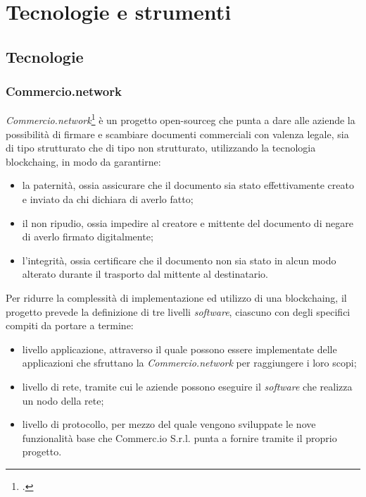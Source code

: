 
\chapter{Tecnologie e strumenti}
\label{cap:tecnologie-strumenti}

\section{Tecnologie}
\subsection{Commercio.network}

\textit{Commercio.network}\footcite{site:commercio-network} è un progetto \gls{open-sourceg} che punta a dare alle aziende la possibilità di firmare e scambiare documenti commerciali con valenza legale, sia di tipo strutturato che di tipo non strutturato, utilizzando la tecnologia \gls{blockchaing}, in modo da garantirne:

\begin{itemize}
	\item la paternità, ossia assicurare che il documento sia stato effettivamente creato e inviato da chi dichiara di averlo fatto;
	\item il non ripudio, ossia impedire al creatore e mittente del documento di negare di averlo firmato digitalmente;
	\item l'integrità, ossia certificare che il documento non sia stato in alcun modo alterato durante il trasporto dal mittente al destinatario.
\end{itemize}

Per ridurre la complessità di implementazione ed utilizzo di una \gls{blockchaing}, il progetto prevede la definizione di tre livelli \textit{software}, ciascuno con degli specifici compiti da portare a termine:

\begin{itemize}
	\item livello applicazione, attraverso il quale possono essere implementate delle applicazioni che sfruttano la \textit{Commercio.network} per raggiungere i loro scopi;
	\item livello di rete, tramite cui le aziende possono eseguire il \textit{software} che realizza un nodo della rete;
	\item livello di protocollo, per mezzo del quale vengono sviluppate le nove funzionalità base che Commerc.io S.r.l. punta a fornire tramite il proprio progetto.
\end{itemize}


